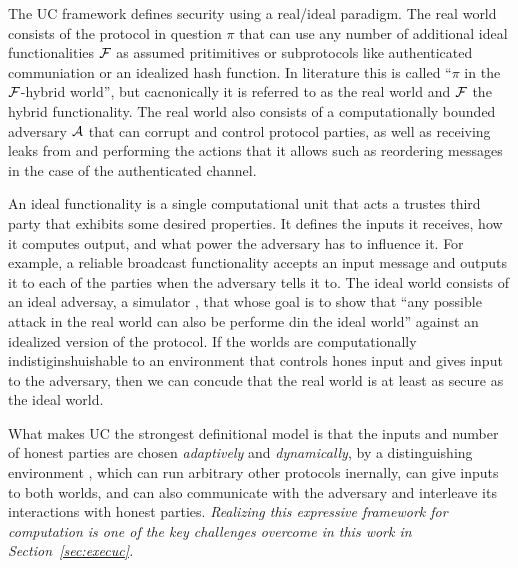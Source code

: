 The UC framework defines security using a real/ideal paradigm.
The real world consists of the protocol in question $\pi$ that can use any number of additional ideal functionalities $\mathcal{F}$ as assumed pritimitives or subprotocols like authenticated communiation or an idealized hash function.
In literature this is called ``$\pi$ in the $\mathcal{F}$-hybrid world'', but cacnonically it is referred to as the real world and $\mathcal{F}$ the hybrid functionality.
The real world also consists of a computationally bounded adversary $\mathcal{A}$ that can corrupt and control protocol parties, as well as receiving leaks from \F and performing the actions that it allows such as reordering messages in the case of the authenticated channel.

An ideal functionality is a single computational unit that acts a trustes third party that exhibits some desired properties. 
It defines the inputs it receives, how it computes output, and what power the adversary has to influence it.
For example, a reliable broadcast functionality accepts an input message and outputs it to each of the parties when the adversary tells it to.
The ideal world consists of an ideal adversay, a simulator \Sim, that whose goal is to show that ``any possible attack in the real world can also be performe din the ideal world'' against an idealized version of the protocol.
If the worlds are computationally indistiginshuishable to an environment that controls hones input and gives input to the adversary, then we can concude that the real world is at least as secure as the ideal world.

What makes UC the strongest definitional model is that the inputs and number of honest parties are chosen \emph{adaptively}
and \emph{dynamically}, by a distinguishing environment \Z, which can run arbitrary other protocols inernally, can give inputs to both worlds, and can also communicate with the adversary and interleave its interactions with honest parties.
\emph{Realizing this expressive framework for computation is one of the key challenges overcome in this work in Section~\ref{sec:execuc}.}


